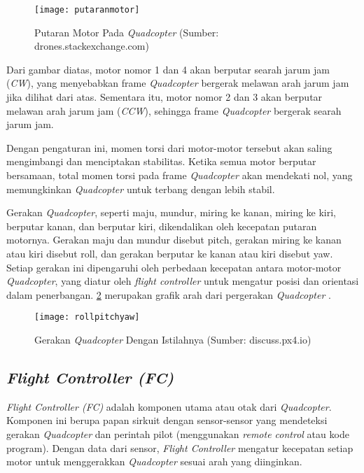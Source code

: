 \begin{figure}[H]
	\centering
	\texttt{[image: putaranmotor]}
	\caption{Putaran Motor Pada \textit{Quadcopter} (Sumber: drones.stackexchange.com)}
	\label{fig:motor}
\end{figure}

Dari gambar diatas, motor nomor 1 dan 4 akan berputar searah jarum jam (\textit{CW}), yang menyebabkan frame \textit{Quadcopter} bergerak melawan arah jarum jam jika dilihat dari atas. Sementara itu, motor nomor 2 dan 3 akan berputar melawan arah jarum jam (\textit{CCW}), sehingga frame \textit{Quadcopter} bergerak searah jarum jam.

Dengan pengaturan ini, momen torsi dari motor-motor tersebut akan saling mengimbangi dan menciptakan stabilitas. Ketika semua motor berputar bersamaan, total momen torsi pada frame \textit{Quadcopter} akan mendekati nol, yang memungkinkan \textit{Quadcopter} untuk terbang dengan lebih stabil.

Gerakan \textit{Quadcopter}, seperti maju, mundur, miring ke kanan, miring ke kiri, berputar kanan, dan berputar kiri, dikendalikan oleh kecepatan putaran motornya. Gerakan maju dan mundur disebut pitch, gerakan miring ke kanan atau kiri disebut roll, dan gerakan berputar ke kanan atau kiri disebut yaw. Setiap gerakan ini dipengaruhi oleh perbedaan kecepatan antara motor-motor \textit{Quadcopter}, yang diatur oleh \textit{flight controller} untuk mengatur posisi dan orientasi dalam penerbangan. \cref{fig:gerakqc} merupakan grafik arah dari pergerakan \textit{Quadcopter} \citep{chandrapa}.

\begin{figure}[H]
	\centering
	\texttt{[image: rollpitchyaw]}
	\caption{Gerakan \textit{Quadcopter} Dengan Istilahnya (Sumber: discuss.px4.io)}
	\label{fig:gerakqc}
\end{figure}

\subsection{\textit{Flight Controller (FC)}}
\textit{Flight Controller (FC)} adalah komponen utama atau otak dari \textit{Quadcopter}. Komponen ini berupa papan sirkuit dengan sensor-sensor yang mendeteksi gerakan \textit{Quadcopter} dan perintah pilot (menggunakan \textit{remote control} atau kode program). Dengan data dari sensor, \textit{Flight Controller} mengatur kecepatan setiap motor untuk menggerakkan \textit{Quadcopter} sesuai arah yang diinginkan.

